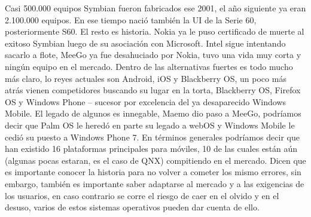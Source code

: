 Casi 500.000 equipos Symbian fueron fabricados ese 2001, el año siguiente ya eran 2.100.000 equipos. En ese tiempo nació también la UI de la Serie 60, posteriormente S60. 
El resto es historia. Nokia ya le puso certificado de muerte al exitoso Symbian luego de su asociación con Microsoft.
Intel sigue intentando sacarlo a flote, MeeGo ya fue desahuciado por Nokia, tuvo una vida muy corta y ningún equipo en el mercado.
Dentro de las alternativas fuertes es todo mucho más claro, lo reyes actuales son Android, iOS y Blackberry OS, un poco más atrás vienen competidores buscando su lugar en 
la torta, Blackberry OS, Firefox OS y Windows Phone  – sucesor por excelencia del ya desaparecido Windows Mobile. El legado de algunos es innegable, Maemo dio paso a MeeGo, 
podríamos decir que Palm OS le heredó en parte su legado a webOS y Windows Mobile le cedió su puesto a Windows Phone 7.
En términos generales podríamos decir que han existido 16 plataformas principales para móviles, 10 de las cuales están aún (algunas pocas estaran, es el caso de QNX) 
compitiendo en el mercado.
Dicen que es importante conocer la historia para no volver a cometer los mismo errores, sin embargo, también es importante saber adaptarse al mercado y a las exigencias de 
los usuarios, en caso contrario se corre el riesgo de caer en el olvido y en el desuso, varios de estos sistemas operativos pueden dar cuenta de ello.

